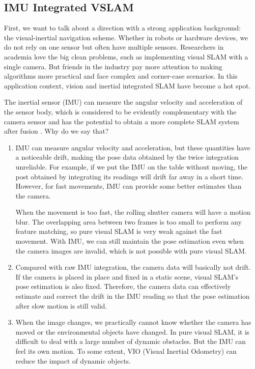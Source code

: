\subsection{IMU Integrated VSLAM}
First, we want to talk about a direction with a strong application background: the visual-inertial navigation scheme. Whether in robots or hardware devices, we do not rely on one sensor but often have multiple sensors. Researchers in academia love the big clean problems, such as implementing visual SLAM with a single camera. But friends in the industry pay more attention to making algorithms more practical and face complex and corner-case scenarios. In this application context, vision and inertial integrated SLAM have become a hot spot.

The inertial sensor (IMU) can measure the angular velocity and acceleration of the sensor body, which is considered to be evidently complementary with the camera sensor and has the potential to obtain a more complete SLAM system after fusion {\cite{Gui2015}}. Why do we say that?

\begin{enumerate}
	\item IMU can measure angular velocity and acceleration, but these quantities have a noticeable drift, making the pose data obtained by the twice integration unreliable. For example, if we put the IMU on the table without moving, the post obtained by integrating its readings will drift far away in a short time. However, for fast movements, IMU can provide some better estimates than the camera. 
	
	When the movement is too fast, the rolling shutter camera will have a motion blur. The overlapping area between two frames is too small to perform any feature matching, so pure visual SLAM is very weak against the fast movement. With IMU, we can still maintain the pose estimation even when the camera images are invalid, which is not possible with pure visual SLAM.
	
	\item Compared with raw IMU integration, the camera data will basically not drift. If the camera is placed in place and fixed in a static scene, visual SLAM's pose estimation is also fixed. Therefore, the camera data can effectively estimate and correct the drift in the IMU reading so that the pose estimation after slow motion is still valid.
		
	\item When the image changes, we practically cannot know whether the camera has moved or the environmental objects have changed. In pure visual SLAM, it is difficult to deal with a large number of dynamic obstacles. But the IMU can feel its own motion. To some extent, VIO (Visual Inertial Odometry) can reduce the impact of dynamic objects.
\end{enumerate}

